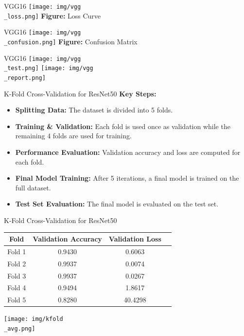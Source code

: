 \documentclass{beamer}
\begin{document}
\begin{frame}{VGG16}
	\centering
     	\texttt{[image: img/vgg\\\_loss.png]}
    	\newline
    	\textbf{Figure:} Loss Curve
\end{frame}

\begin{frame}{VGG16}
	\centering
     	\texttt{[image: img/vgg\\\_confusion.png]}
    	\newline
    	\textbf{Figure:} Confusion Matrix
\end{frame}

\begin{frame}{VGG16}
	\centering
     	\texttt{[image: img/vgg\\\_test.png]}
	\texttt{[image: img/vgg\\\_report.png]}
\end{frame}

\begin{frame}{K-Fold Cross-Validation for ResNet50}
    \textbf{Key Steps:}
    \begin{itemize}
        \item \textbf{Splitting Data:} The dataset is divided into 5 folds.
        \item \textbf{Training \& Validation:} Each fold is used once as validation while the remaining 4 folds are used for training.
        \item \textbf{Performance Evaluation:} Validation accuracy and loss are computed for each fold.
        \item \textbf{Final Model Training:} After 5 iterations, a final model is trained on the full dataset.
        \item \textbf{Test Set Evaluation:} The final model is evaluated on the test set.
    \end{itemize}
\end{frame}

\begin{frame}{K-Fold Cross-Validation for ResNet50}
    \begin{table}[]
        \centering
        \begin{tabular}{cccc}
            \toprule
            \textbf{Fold} & \textbf{Validation Accuracy} & \textbf{Validation Loss}  \\
            \midrule
            Fold 1  & 0.9430  & 0.6063   \\
            Fold 2  & 0.9937  & 0.0074   \\
            Fold 3  & 0.9937  & 0.0267   \\
            Fold 4  & 0.9494  & 1.8617   \\
            Fold 5  & 0.8280  & 40.4298 \\
            \midrule
        \end{tabular}
    \end{table}
	\texttt{[image: img/kfold\\\_avg.png]}
\end{frame}
\end{document}
